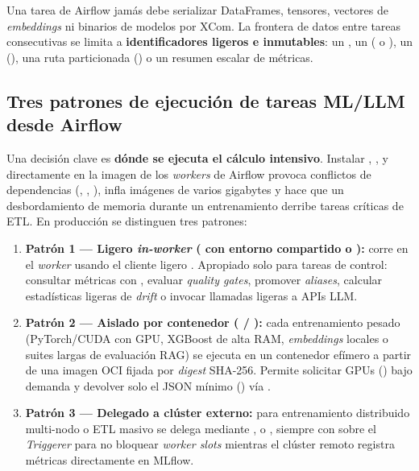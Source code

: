 \begin{infobox}
Una tarea de Airflow jamás debe serializar DataFrames, tensores, vectores de \textit{embeddings} ni binarios de modelos por XCom. La frontera de datos entre tareas consecutivas se limita a \textbf{identificadores ligeros e inmutables}: un , un  ( o ), un  (), una ruta  particionada () o un resumen escalar de métricas.
\end{infobox}

\subsection{Tres patrones de ejecución de tareas ML/LLM desde Airflow}

Una decisión clave es \textbf{dónde se ejecuta el cálculo intensivo}. Instalar , ,  y  directamente en la imagen de los \textit{workers} de Airflow provoca conflictos de dependencias (, , ), infla imágenes de varios gigabytes y hace que un desbordamiento de memoria durante un entrenamiento derribe tareas críticas de ETL. En producción se distinguen tres patrones:

\begin{enumerate}
  \item \textbf{Patrón 1 --- Ligero \textit{in-worker} ( con entorno compartido o ):} corre en el \textit{worker} usando el cliente ligero . Apropiado solo para tareas de control: consultar métricas con , evaluar \textit{quality gates}, promover \textit{aliases}, calcular estadísticas ligeras de \textit{drift} o invocar llamadas ligeras a APIs LLM.
  \item \textbf{Patrón 2 --- Aislado por contenedor ( / ):} cada entrenamiento pesado (PyTorch/CUDA con GPU, XGBoost de alta RAM, \textit{embeddings} locales o suites largas de evaluación RAG) se ejecuta en un contenedor efímero a partir de una imagen OCI fijada por \textit{digest} SHA-256. Permite solicitar GPUs () bajo demanda y devolver solo el JSON mínimo () vía .
  \item \textbf{Patrón 3 --- Delegado a clúster externo:} para entrenamiento distribuido multi-nodo o ETL masivo se delega mediante ,  o , siempre con  sobre el \textit{Triggerer} para no bloquear \textit{worker slots} mientras el clúster remoto registra métricas directamente en MLflow.
\end{enumerate}

